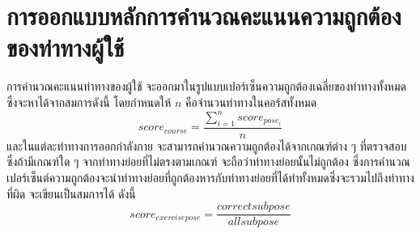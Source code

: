 \section{การออกแบบหลักการคำนวณคะแนนความถูกต้องของท่าทางผู้ใช้}
การคำนวณคะแนนท่าทางของผู้ใช้ จะออกมาในรูปแบบเปอร์เซ็นความถูกต้องเฉลี่ยของท่าทางทั้งหมด ซึ่งจะหาได้จากสมการดังนี้ โดยกำหนดให้ $n$ คือจำนวนท่าทางในคอร์สทั้งหมด
\begin{equation}
    score_{course} = \frac{\sum_{i=1}^{n}{score_{pose_i}}}{n}
\end{equation}
และในแต่ละท่าทางการออกกำลังกาย จะสามารถคำนวณความถูกต้องได้จากเกณฑ์ต่าง ๆ ที่ตรวจสอบ ซึ่งถ้ามีเกณฑ์ใด ๆ จากท่าทางย่อยที่ไม่ตรงตามเกณฑ์ จะถือว่าท่าทางย่อยนั้นไม่ถูกต้อง ซึ่งการคำนวณเปอร์เซ็นต์ความถูกต้องจะนำท่าทางย่อยที่ถูกต้องหารกับท่าทางย่อยที่ได้ทำทั้งหมดซึ่งจะรวมไปถึงท่าทางที่ผิด จะเขียนเป็นสมการได้ ดังนี้
\begin{equation}
    score_{exercise pose} = \frac{correct subpose}{all subpose}
\end{equation}